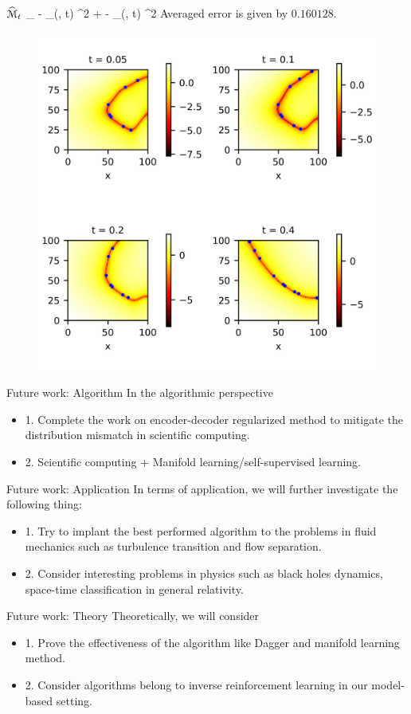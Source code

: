 \documentclass{beamer}
\begin{document}
\begin{frame}{$\widehat {\mathcal{M}}_t $}
	\bequn
		\min_{\theta} \mbE \norml \mfu - \phi_{\theta}(\mfx, t) \normr^2 + \lambda \norml \wht \mfu - \phi_{\theta}(\wht \mfx, t) \normr^2
	\eequn
	Averaged error is given by $0.160128$.
	\begin{figure}[H]
          \centering
          \centerline{\includegraphics[width=0.65\linewidth]{fig/control4.jpg}}
          \label{l2-mfd}
	\end{figure}
\end{frame}


\begin{frame}{Future work: Algorithm}
In the algorithmic perspective
	\begin{itemize}
		\item 1. Complete the work on encoder-decoder regularized method to mitigate the distribution mismatch in scientific computing.
		\item 2. Scientific computing + Manifold learning/self-supervised learning.
	\end{itemize}

\end{frame}


\begin{frame}{Future work: Application}
	In terms of application, we will further investigate the following thing:
	\begin{itemize}
		\item 1. Try to implant the best performed algorithm to the problems in fluid mechanics such as turbulence transition and flow separation.
		\item 2. Consider interesting problems in physics such as black holes dynamics, space-time classification in general relativity.
	\end{itemize}

\end{frame}


\begin{frame}{Future work: Theory}
Theoretically, we will consider
	\begin{itemize}
		\item 1. Prove the effectiveness of the algorithm like Dagger and manifold learning method.
		\item 2. Consider algorithms belong to inverse reinforcement learning in our model-based setting.
	\end{itemize}

\end{frame}
\end{document}
